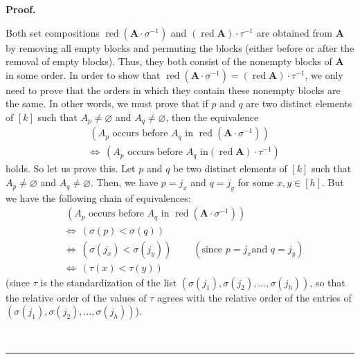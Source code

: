 \documentclass[numbers=enddot,12pt,final,onecolumn,notitlepage]{scrartcl}%
\theoremstyle{definition}
\newenvironment{fineprint}{\begin{small}}{\end{small}}
\newenvironment{proof}[1][Proof]{\noindent\textbf{#1.} }{\ \rule{0.5em}{0.5em}}
\begin{document}
\begin{proof}
\begin{fineprint}
Both set compositions $\operatorname*{red}\left(  \mathbf{A}\cdot\sigma
^{-1}\right)  $ and $\left(  \operatorname*{red}\mathbf{A}\right)  \cdot
\tau^{-1}$ are obtained from $\mathbf{A}$ by removing all empty blocks and
permuting the blocks (either before or after the removal of empty blocks).
Thus, they both consist of the nonempty blocks of $\mathbf{A}$ in some order.
In order to show that $\operatorname*{red}\left(  \mathbf{A}\cdot\sigma
^{-1}\right)  =\left(  \operatorname*{red}\mathbf{A}\right)  \cdot\tau^{-1}$,
we only need to prove that the orders in which they contain these nonempty
blocks are the same. In other words, we must prove that if $p$ and $q$ are two
distinct elements of $\left[  k\right]  $ such that $A_{p}\neq\varnothing$ and
$A_{q}\neq\varnothing$, then the equivalence%
\begin{align}
&  \ \left(  A_{p}\text{ occurs before }A_{q}\text{ in }\operatorname*{red}%
\left(  \mathbf{A}\cdot\sigma^{-1}\right)  \right) \nonumber\\
&  \Longleftrightarrow\ \left(  A_{p}\text{ occurs before }A_{q}\text{ in
}\left(  \operatorname*{red}\mathbf{A}\right)  \cdot\tau^{-1}\right)
\label{pf.prop.PNSym.g-square.goal}%
\end{align}
holds. So let us prove this. Let $p$ and $q$ be two distinct elements of
$\left[  k\right]  $ such that $A_{p}\neq\varnothing$ and $A_{q}%
\neq\varnothing$. Then, we have $p=j_{x}$ and $q=j_{y}$ for some
$x,y\in\left[  h\right]  $. But we have the following chain of equivalences:%
\begin{align*}
&  \ \left(  A_{p}\text{ occurs before }A_{q}\text{ in }\operatorname*{red}%
\left(  \mathbf{A}\cdot\sigma^{-1}\right)  \right) \\
&  \Longleftrightarrow\ \left(  \sigma\left(  p\right)  <\sigma\left(
q\right)  \right) \\
&  \Longleftrightarrow\ \left(  \sigma\left(  j_{x}\right)  <\sigma\left(
j_{y}\right)  \right)  \ \ \ \ \ \ \ \ \ \ \left(  \text{since }p=j_{x}\text{
and }q=j_{y}\right) \\
&  \Longleftrightarrow\ \left(  \tau\left(  x\right)  <\tau\left(  y\right)
\right)
\end{align*}
(since $\tau$ is the standardization of the list $\left(  \sigma\left(
j_{1}\right)  ,\sigma\left(  j_{2}\right)  ,\ldots,\sigma\left(  j_{h}\right)
\right)  $, so that the relative order of the values of $\tau$ agrees with the
relative order of the entries of $\left(  \sigma\left(  j_{1}\right)
,\sigma\left(  j_{2}\right)  ,\ldots,\sigma\left(  j_{h}\right)  \right)  $).

\end{fineprint}
\end{proof}
\end{document}

